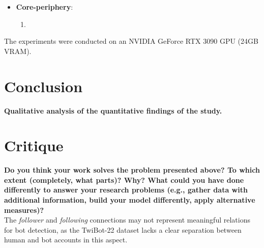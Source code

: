 \documentclass[12pt, a4paper]{article}
\begin{document}
\begin{itemize}
		\item \textbf{Core-periphery}:
			\begin{enumerate}
				\item 	
			\end{enumerate}
	\end{itemize}
	The experiments were conducted on an NVIDIA GeForce RTX 3090 GPU (24GB VRAM).\\


\section{Conclusion}
	\label{conclusion}

	\textbf{Qualitative analysis of the quantitative findings of the study.}


\section{Critique}
	\label{critique}

	\textbf{Do you think your work solves the problem presented above? To which extent (completely, what parts)? Why? What could you have done differently to answer your research problems (e.g., gather data with additional information, build your model differently, apply alternative measures)?}\\

	The \textit{follower} and \textit{following} connections may not represent meaningful relations for bot detection, as the TwiBot-22 dataset lacks a clear separation between human and bot accounts in this aspect.




\end{document}
